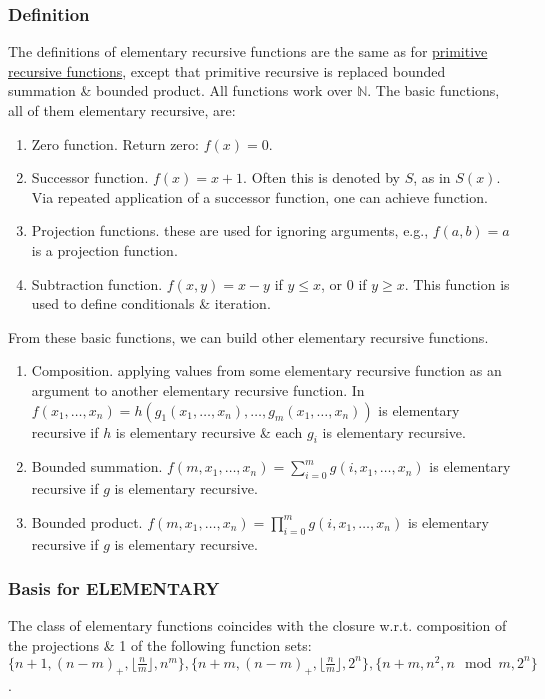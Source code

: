 \documentclass{article}
\begin{document}
\subsubsection{Definition}
The definitions of elementary recursive functions are the same as for \href{https://en.wikipedia.org/wiki/Primitive_recursive_function}{primitive recursive functions}, except that primitive recursive is replaced bounded summation \& bounded product. All functions work over $\mathbb{N}$. The basic functions, all of them elementary recursive, are:
\begin{enumerate}
	\item {\sf Zero function.} Return zero: $f(x) = 0$.
	\item {\sf Successor function.} $f(x) = x + 1$. Often this is denoted by $S$, as in $S(x)$. Via repeated application of a successor function, one can achieve function.
	\item {\sf Projection functions.} these are used for ignoring arguments, e.g., $f(a,b) = a$ is a projection function.
	\item {\sf Subtraction function.} $f(x,y) = x - y$ if $y\le x$, or 0 if $y\ge x$. This function is used to define conditionals \& iteration.
\end{enumerate}
From these basic functions, we can build other elementary recursive functions.
\begin{enumerate}
	\item {\sf Composition.} applying values from some elementary recursive function as an argument to another elementary recursive function. In $f(x_1,\ldots,x_n) = h(g_1(x_1,\ldots,x_n),\ldots,g_m(x_1,\ldots,x_n))$ is elementary recursive if $h$ is elementary recursive \& each $g_i$ is elementary recursive.
	\item {\sf Bounded summation.} $f(m,x_1,\ldots,x_n) = \sum_{i=0}^m g(i,x_1,\ldots,x_n)$ is elementary recursive if $g$ is elementary recursive.
	\item {\sf Bounded product.} $f(m,x_1,\ldots,x_n) = \prod_{i=0}^m g(i,x_1,\ldots,x_n)$ is elementary recursive if $g$ is elementary recursive.
\end{enumerate}

\subsubsection{Basis for ELEMENTARY}
The class of elementary functions coincides with the closure w.r.t. composition of the projections \& 1 of the following function sets: $\{n + 1,(n - m)_+,\lfloor\frac{n}{m}\rfloor,n^m\},\{n + m,(n - m)_+,\lfloor\frac{n}{m}\rfloor,2^n\},\{n + m,n^2,n\mod m,2^n\}$.
\end{document}
